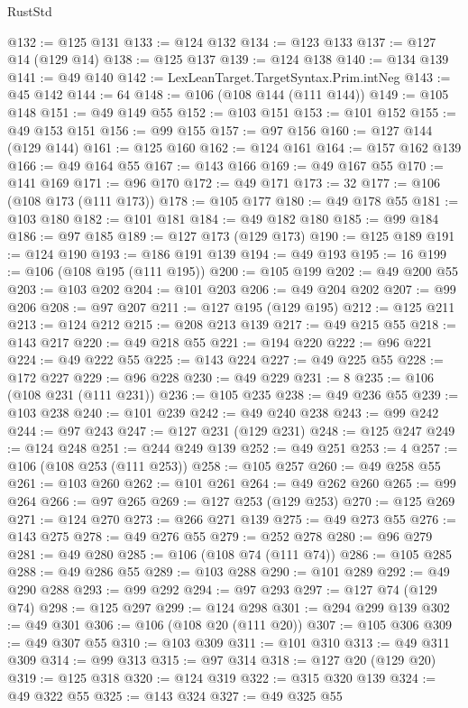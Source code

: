 \begin{lexlean}{RustStd}
\begin{coremodule}
@132 := @125 @131
@133 := @124 @132
@134 := @123 @133
@137 := @127 @14 (@129 @14)
@138 := @125 @137
@139 := @124 @138
@140 := @134 @139
@141 := @49 @140
@142 := LexLeanTarget.TargetSyntax.Prim.intNeg
@143 := @45 @142
@144 := 64
@148 := @106 (@108 @144 (@111 @144))
@149 := @105 @148
@151 := @49 @149 @55
@152 := @103 @151
@153 := @101 @152
@155 := @49 @153 @151
@156 := @99 @155
@157 := @97 @156
@160 := @127 @144 (@129 @144)
@161 := @125 @160
@162 := @124 @161
@164 := @157 @162 @139
@166 := @49 @164 @55
@167 := @143 @166
@169 := @49 @167 @55
@170 := @141 @169
@171 := @96 @170
@172 := @49 @171
@173 := 32
@177 := @106 (@108 @173 (@111 @173))
@178 := @105 @177
@180 := @49 @178 @55
@181 := @103 @180
@182 := @101 @181
@184 := @49 @182 @180
@185 := @99 @184
@186 := @97 @185
@189 := @127 @173 (@129 @173)
@190 := @125 @189
@191 := @124 @190
@193 := @186 @191 @139
@194 := @49 @193
@195 := 16
@199 := @106 (@108 @195 (@111 @195))
@200 := @105 @199
@202 := @49 @200 @55
@203 := @103 @202
@204 := @101 @203
@206 := @49 @204 @202
@207 := @99 @206
@208 := @97 @207
@211 := @127 @195 (@129 @195)
@212 := @125 @211
@213 := @124 @212
@215 := @208 @213 @139
@217 := @49 @215 @55
@218 := @143 @217
@220 := @49 @218 @55
@221 := @194 @220
@222 := @96 @221
@224 := @49 @222 @55
@225 := @143 @224
@227 := @49 @225 @55
@228 := @172 @227
@229 := @96 @228
@230 := @49 @229
@231 := 8
@235 := @106 (@108 @231 (@111 @231))
@236 := @105 @235
@238 := @49 @236 @55
@239 := @103 @238
@240 := @101 @239
@242 := @49 @240 @238
@243 := @99 @242
@244 := @97 @243
@247 := @127 @231 (@129 @231)
@248 := @125 @247
@249 := @124 @248
@251 := @244 @249 @139
@252 := @49 @251
@253 := 4
@257 := @106 (@108 @253 (@111 @253))
@258 := @105 @257
@260 := @49 @258 @55
@261 := @103 @260
@262 := @101 @261
@264 := @49 @262 @260
@265 := @99 @264
@266 := @97 @265
@269 := @127 @253 (@129 @253)
@270 := @125 @269
@271 := @124 @270
@273 := @266 @271 @139
@275 := @49 @273 @55
@276 := @143 @275
@278 := @49 @276 @55
@279 := @252 @278
@280 := @96 @279
@281 := @49 @280
@285 := @106 (@108 @74 (@111 @74))
@286 := @105 @285
@288 := @49 @286 @55
@289 := @103 @288
@290 := @101 @289
@292 := @49 @290 @288
@293 := @99 @292
@294 := @97 @293
@297 := @127 @74 (@129 @74)
@298 := @125 @297
@299 := @124 @298
@301 := @294 @299 @139
@302 := @49 @301
@306 := @106 (@108 @20 (@111 @20))
@307 := @105 @306
@309 := @49 @307 @55
@310 := @103 @309
@311 := @101 @310
@313 := @49 @311 @309
@314 := @99 @313
@315 := @97 @314
@318 := @127 @20 (@129 @20)
@319 := @125 @318
@320 := @124 @319
@322 := @315 @320 @139
@324 := @49 @322 @55
@325 := @143 @324
@327 := @49 @325 @55

\end{coremodule}
\end{lexlean}
